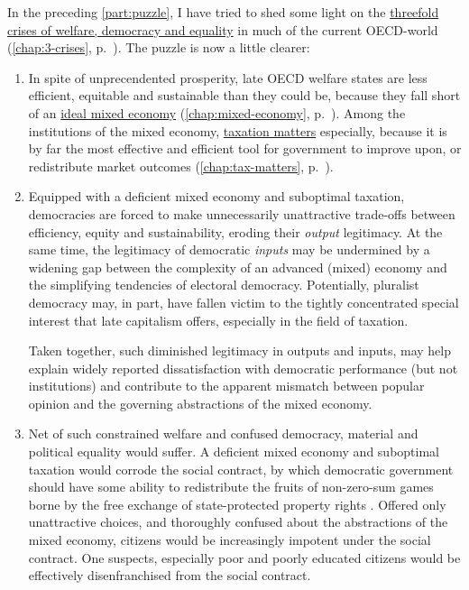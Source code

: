 
In the preceding \autoref{part:puzzle}, I have tried to shed some light on the \hyperref[chap:3-crises]{threefold crises of welfare, democracy and equality} in much of the current \gls{OECD}-world (\autoref{chap:3-crises}, p.~\pageref{chap:3-crises}).
The puzzle is now a little clearer:

\begin{enumerate}
	\item
		In spite of unprecendented prosperity, late \gls{OECD} welfare states are less efficient, equitable and sustainable than they could be, because they fall short of an \hyperref[chap:mixed-economy]{ideal mixed economy} (\autoref{chap:mixed-economy}, p.~\pageref{chap:mixed-economy}).
		Among the institutions of the mixed economy, \hyperref[chap:tax-matters]{taxation matters} especially, because it is by far the most effective and efficient tool for government to improve upon, or redistribute market outcomes (\autoref{chap:tax-matters}, p.~\pageref{chap:tax-matters}).
	\item
		Equipped with a deficient mixed economy and suboptimal taxation, democracies are forced to make unnecessarily unattractive trade-offs between efficiency, equity and sustainability, eroding their \emph{output} legitimacy.
		At the same time, the legitimacy of democratic \emph{inputs} may be undermined by a widening gap between the complexity of an advanced (mixed) economy and the simplifying tendencies of electoral democracy.
		Potentially, pluralist democracy may, in part, have fallen victim to the tightly concentrated special interest that late capitalism offers, especially in the field of taxation.

		Taken together, such diminished legitimacy in outputs and inputs, may help explain widely reported dissatisfaction with democratic performance (but not institutions) \citep[for example,][]{Dalton-2004-aa} and contribute to the apparent mismatch between popular opinion and the governing abstractions of the mixed economy.
	\item
		Net of such constrained welfare and confused democracy, material and political equality would suffer.
		A deficient mixed economy and suboptimal taxation would corrode the social contract, by which democratic government should have some ability to redistribute the fruits of non-zero-sum %
		games borne by the free exchange of state-protected property rights \citep[compare][]{Crouch2004}.
		Offered only unattractive choices, and thoroughly confused about the abstractions of the mixed economy, citizens would be increasingly impotent under the social contract.
		One suspects, especially poor and poorly educated citizens would be effectively disenfranchised from the social contract.
\end{enumerate}

